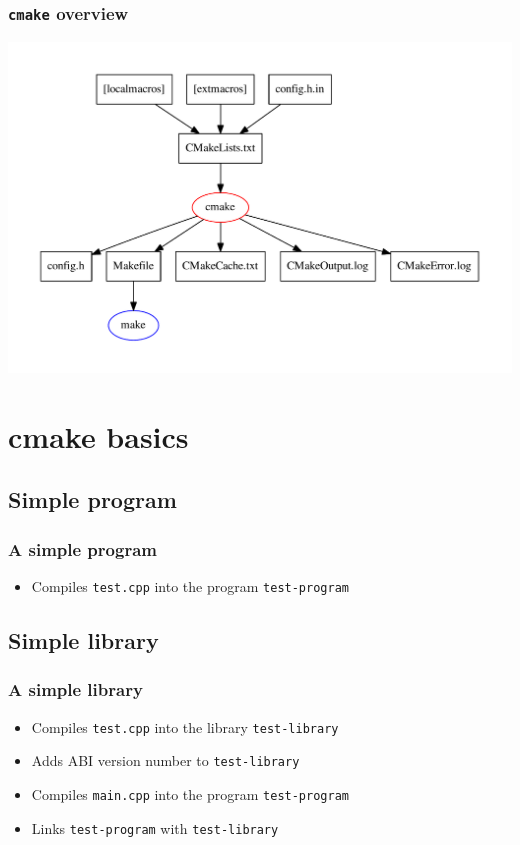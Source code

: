 \documentclass{beamer}
\newcommand{\cmd}[1]{\textbf{\texttt{#1}}}
\begin{document}
\begin{frame}
  \frametitle{\cmd{cmake} overview}
  \medskip
  \centering
  \includegraphics[width=\textwidth]{cmake}
\end{frame}

\section{cmake basics}

\subsection{Simple program}

\begin{frame}
  \frametitle{A simple program}

  

  \begin{itemize}
  \item Compiles \texttt{test.cpp} into the program \texttt{test-program}
  \end{itemize}

\end{frame}


\subsection{Simple library}

\begin{frame}
  \frametitle{A simple library}

  

  \begin{itemize}
  \item Compiles \texttt{test.cpp} into the library \texttt{test-library}
  \item Adds ABI version number to \texttt{test-library}
  \item Compiles \texttt{main.cpp} into the program \texttt{test-program}
  \item Links \texttt{test-program} with \texttt{test-library}
  \end{itemize}
\end{frame}
\end{document}
